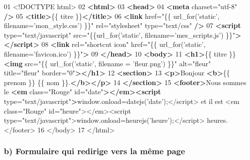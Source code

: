 \documentclass{article}
\newenvironment{Shaded}{}{}
\newcommand{\KeywordTok}[1]{\textcolor[rgb]{0.00,0.44,0.13}{\textbf{{#1}}}}
\newcommand{\DataTypeTok}[1]{\textcolor[rgb]{0.56,0.13,0.00}{{#1}}}
\newcommand{\DecValTok}[1]{\textcolor[rgb]{0.25,0.63,0.44}{{#1}}}
\newcommand{\StringTok}[1]{\textcolor[rgb]{0.25,0.44,0.63}{{#1}}}
\newcommand{\OtherTok}[1]{\textcolor[rgb]{0.00,0.44,0.13}{{#1}}}
\newcommand{\FunctionTok}[1]{\textcolor[rgb]{0.02,0.16,0.49}{{#1}}}
\newcommand{\NormalTok}[1]{{#1}}
\begin{document}
\begin{Shaded}
\begin{Highlighting}[]
\NormalTok{01 }\DataTypeTok{<!DOCTYPE }\NormalTok{html}\DataTypeTok{>}
\NormalTok{02 }\KeywordTok{<html>}
\NormalTok{03 }\KeywordTok{<head>}
\NormalTok{04 }\KeywordTok{<meta}\OtherTok{ charset=}\StringTok{"utf-8"} \KeywordTok{/>}
\NormalTok{05 }\KeywordTok{<title>}\NormalTok{\{\{ titre \}\}}\KeywordTok{</title>}
\NormalTok{06 }\KeywordTok{<link}\OtherTok{ href=}\StringTok{"\{\{ url_for('static', filename='mon_style.css') \}\}"}\OtherTok{ rel=}\StringTok{"stylesheet"}\OtherTok{ type=}\StringTok{"text/css"} \KeywordTok{/>}
\NormalTok{07 }\KeywordTok{<script}\OtherTok{ type=}\StringTok{"text/javascript"}\OtherTok{ src=}\StringTok{"\{\{url_for('static', filename='mes_scripts.js') \}\}"}\KeywordTok{></script>}
\NormalTok{08 }\KeywordTok{<link}\OtherTok{ rel=}\StringTok{"shortcut icon"}\OtherTok{ href=}\StringTok{"\{\{ url_for('static', filename='favicon.ico') \}\}"}\KeywordTok{>}
\NormalTok{09 }\KeywordTok{</head>}
\NormalTok{10 }\KeywordTok{<body>}
\NormalTok{11 }\KeywordTok{<h1>}\NormalTok{\{\{ titre \}\} }\KeywordTok{<img}\OtherTok{ src=}\StringTok{"\{\{ url_for('static', filename = 'fleur.png') \}\}"}\OtherTok{  alt=}\StringTok{"fleur"}\OtherTok{ title=}\StringTok{"fleur"}\OtherTok{ border=}\StringTok{"0"}\KeywordTok{></h1>}
\NormalTok{12 }\KeywordTok{<section>}
\NormalTok{13 }\KeywordTok{<p>}\NormalTok{Bonjour }\KeywordTok{<b>}\NormalTok{\{\{ prenom \}\} \{\{ nom \}\}.}\KeywordTok{</b></p>}
\NormalTok{14 }\KeywordTok{</section>}
\NormalTok{15 }\KeywordTok{<footer>}\NormalTok{Nous sommes le }\KeywordTok{<em}\OtherTok{ class=}\StringTok{"Rouge"}\OtherTok{ id=}\StringTok{"date"}\KeywordTok{></em><script}\OtherTok{ type=}\StringTok{"text/javascript"}\KeywordTok{>}\OtherTok{window}\NormalTok{.}\FunctionTok{onload}\NormalTok{=}\FunctionTok{datejs}\NormalTok{(}\StringTok{'date'}\NormalTok{);<}\OtherTok{/script> et il est <em class="Rouge" id="heure"></em}\NormalTok{><script type=}\StringTok{"text/javascript"}\NormalTok{>}\OtherTok{window}\NormalTok{.}\FunctionTok{onload}\NormalTok{=}\FunctionTok{heurejs}\NormalTok{(}\StringTok{'heure'}\NormalTok{);<}\OtherTok{/script> heures. </footer}\NormalTok{>}
\DecValTok{16} \NormalTok{<}\OtherTok{/body>}
\OtherTok{17 </html}\NormalTok{>}
\end{Highlighting}
\end{Shaded}

    \subsubsection{b) Formulaire qui redirige vers la même
page}\label{b-formulaire-qui-redirige-vers-la-muxeame-page}
\end{document}
